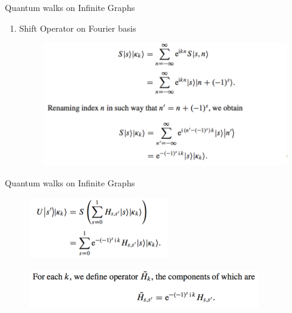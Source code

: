 \documentclass[xcolor=svgnames]{beamer}
\begin{document}
\begin{frame}{Quantum walks on Infinite Graphs}
\begin{enumerate}
    \item Shift Operator on Fourier basis
    \begin{figure}
        \includegraphics[width = 11cm]{ShiftLine2.png}
    \end{figure}
\end{enumerate}
    
\end{frame}
\begin{frame}{Quantum walks on Infinite Graphs}
    \begin{figure}
    \includegraphics[width = 6cm]{UonLine.png}
    \end{figure}
    \begin{figure}
    \includegraphics[width = 10cm]{H_K.png}
    \end{figure}
\end{frame}
\end{document}
